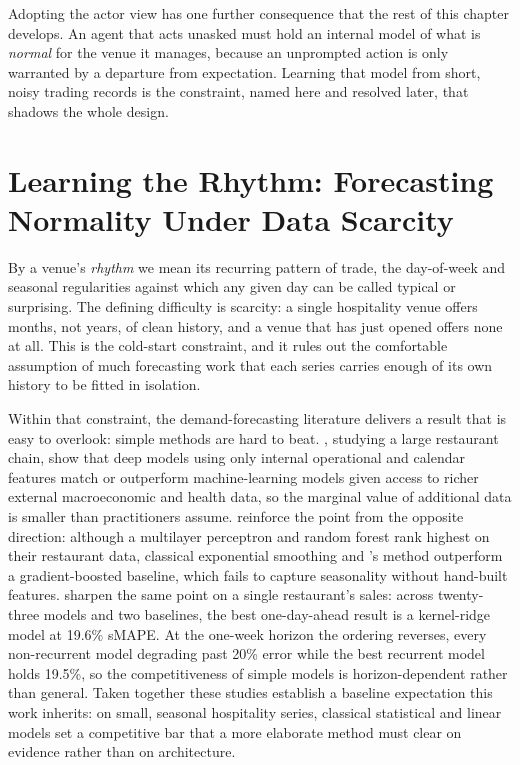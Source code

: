 Adopting the actor view has one further consequence that the rest of this
chapter develops. An agent that acts unasked must hold an internal model of what
is \emph{normal} for the venue it manages, because an unprompted action is only
warranted by a departure from expectation. Learning that model from short,
noisy trading records is the constraint, named here and resolved later, that
shadows the whole design.

\section{Learning the Rhythm: Forecasting Normality Under Data Scarcity}
\label{sec:rw-rhythm}

By a venue's \emph{rhythm} we mean its recurring pattern of trade, the
day-of-week and seasonal regularities against which any given day can be
called typical or surprising. The defining difficulty is scarcity: a single
hospitality venue offers months, not years, of clean history, and a venue
that has just opened offers none at all. This is the cold-start constraint,
and it rules out the comfortable assumption of much forecasting work that each
series carries enough of its own history to be fitted in isolation.

Within that constraint, the demand-forecasting literature delivers a result
that is easy to overlook: simple methods are hard to beat.
\citet{chae_value_2024}, studying a large restaurant chain, show that deep
models using only internal operational and calendar features match or
outperform machine-learning models given access to richer external
macroeconomic and health data, so the marginal value of additional data is
smaller than practitioners assume. \citet{hossain_comparative_2025}
reinforce the point from the opposite direction: although a multilayer
perceptron and random forest rank highest on their restaurant data, classical
exponential smoothing and \citet{croston_forecasting_1972}'s method outperform
a gradient-boosted baseline, which fails to capture seasonality without
hand-built features. \citet{schmidt_machine_2022} sharpen the same point on a
single restaurant's sales: across twenty-three models and two baselines, the
best one-day-ahead result is a kernel-ridge model at 19.6\% sMAPE. At the
one-week horizon the ordering reverses, every non-recurrent model degrading
past 20\% error while the best recurrent model holds 19.5\%, so the
competitiveness of simple models is horizon-dependent rather than general.
Taken together these studies establish a baseline expectation this work
inherits: on small, seasonal hospitality series, classical statistical and
linear models set a competitive bar that a more elaborate method must clear on
evidence rather than on architecture.

